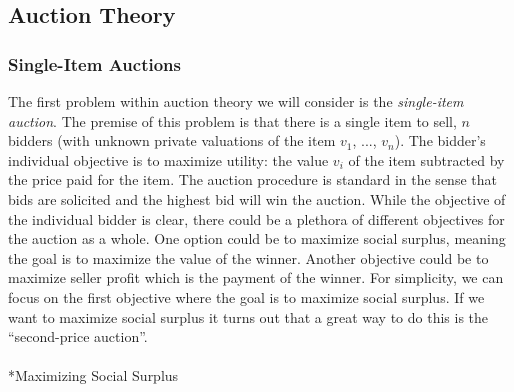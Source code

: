 \documentclass[
  letterpaper,
  DIV=11,
  numbers=noendperiod,
  oneside]{scrreprt}
\makeatletter
\let\oldparagraph\paragraph
\renewcommand{\paragraph}{
    \@ifstar
      \xxxParagraphStar
      \xxxParagraphNoStar
  }
\newcommand{\xxxParagraphStar}[1]{\oldparagraph*{#1}\mbox{}}
\newcommand{\xxxParagraphNoStar}[1]{\oldparagraph{#1}\mbox{}}
\theoremstyle{remark}
\makeatother
\begin{document}
\subsection{Auction Theory}\label{auction-theory}

\subsubsection*{Single-Item Auctions}\label{single-item-auctions}

The first problem within auction theory we will consider is the
\emph{single-item auction}. The premise of this problem is that there is
a single item to sell, \(n\) bidders (with unknown private valuations of
the item \(v_1\), ..., \(v_n\)). The bidder's individual objective is to
maximize utility: the value \(v_i\) of the item subtracted by the price
paid for the item. The auction procedure is standard in the sense that
bids are solicited and the highest bid will win the auction. While the
objective of the individual bidder is clear, there could be a plethora
of different objectives for the auction as a whole. One option could be
to maximize social surplus, meaning the goal is to maximize the value of
the winner. Another objective could be to maximize seller profit which
is the payment of the winner. For simplicity, we can focus on the first
objective where the goal is to maximize social surplus. If we want to
maximize social surplus it turns out that a great way to do this is the
``second-price auction''.

\paragraph*{Maximizing Social Surplus}\label{maximizing-social-surplus}
\end{document}
